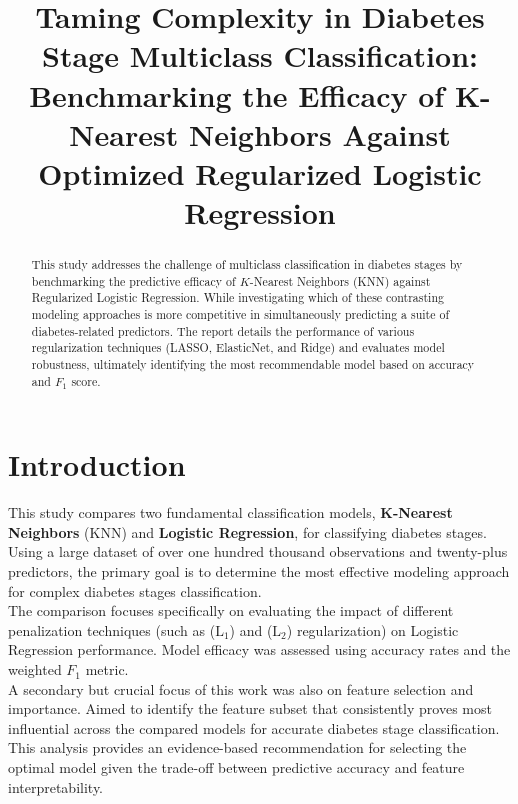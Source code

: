 \documentclass[conference]{IEEEtran}
\begin{document}
\title{Taming Complexity in Diabetes Stage Multiclass Classification: Benchmarking the Efficacy of K-Nearest Neighbors Against Optimized Regularized Logistic Regression}

\author{
}


\maketitle

\begin{abstract}
This study addresses the challenge of multiclass classification in diabetes stages by benchmarking the predictive efficacy of $K$-Nearest Neighbors (KNN) against Regularized Logistic Regression. While investigating which of these contrasting modeling approaches is more competitive in simultaneously predicting a suite of diabetes-related predictors. The report details the performance of various regularization techniques (LASSO, ElasticNet, and Ridge) and evaluates model robustness, ultimately identifying the most recommendable model based on accuracy and $F_1$ score.\\
\end{abstract}

\section{\textbf{Introduction}}
\indent This study compares two fundamental classification models, \textbf{K-Nearest Neighbors} (KNN) and \textbf{Logistic Regression}, for classifying diabetes stages. Using a large dataset of over one hundred thousand observations and twenty-plus predictors, the primary goal is to determine the most effective modeling approach for complex diabetes stages classification.\\
\indent The comparison focuses specifically on evaluating the impact of different penalization techniques (such as ($\text{L}_1$) and ($\text{L}_2$) regularization) on Logistic Regression performance. Model efficacy was assessed using accuracy rates and the weighted $F_1$ metric.\\
\indent A secondary but crucial focus of this work was also on feature selection and importance. Aimed to identify the feature subset that consistently proves most influential across the compared models for accurate diabetes stage classification. \\
\indent This analysis provides an evidence-based recommendation for selecting the optimal model given the trade-off between predictive accuracy and feature interpretability. \\
\end{document}
